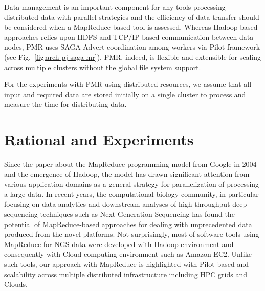 \documentclass{sig-alternate}
\begin{document}
Data management is an important component for any tools processing distributed data with parallel strategies and the efficiency of data transfer should be considered when a MapReduce-based tool is assessed.  Whereas Hadoop-based approaches relies upon HDFS and TCP/IP-based communication between data nodes, PMR uses SAGA Advert coordination among workers via Pilot framework (see Fig.~\ref{fig:arch-pj-saga-mr}).  PMR, indeed, is flexible and extensible for scaling across multiple clusters without the global file system support.  
 
 
For the experiments with PMR using distributed resources, we assume that all input and required data are stored initially on a single cluster to process and measure the time for distributing data.  


\section{Rational and Experiments}\label{sec:experiments}



Since the paper about the MapReduce programming model from Google in 2004\cite{mapreduce-2004-dean} and the emergence of Hadoop, the model has drawn significant attention from various application domains as a general strategy for parallelization of processing a large data.  In recent years, the computational biology community, in particular focusing on data analytics and downstream analyses of high-throughput deep sequencing techniques such as Next-Generation Sequencing has found the potential of MapReduce-based approaches for dealing with unprecedented data produced from the novel platforms\cite{schatz-nature-biotech-2010}.  Not surprisingly, most of software tools using MapReduce for NGS data were developed with Hadoop environment and consequently with Cloud computing environment such as Amazon EC2.  Unlike such tools, our approach with MapReduce is highlighted with Pilot-based and scalability across multiple distributed infrastructure including HPC grids and Clouds.  
\end{document}
